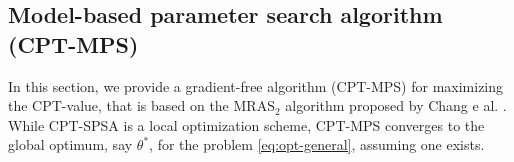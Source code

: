 % 
% 
% 


\subsection{Model-based parameter search algorithm (CPT-MPS)}
\label{sec:mras}
In this section, we provide a gradient-free algorithm (CPT-MPS) for maximizing the CPT-value, that is based on the MRAS$_2$ algorithm proposed by Chang e al. \cite{chang2013simulation}.
While CPT-SPSA is a local optimization scheme, CPT-MPS converges to the global optimum, say $\theta^*$, for the problem \eqref{eq:opt-general}, assuming one exists.



